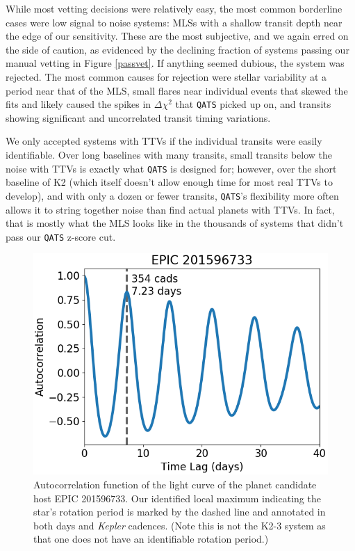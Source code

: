 \documentclass[twocolumn]{aastex62}
\newcommand{\project}[1]{\textsl{#1}}
\newcommand{\pipeline}[1]{\texttt{#1}}
\begin{document}
While most vetting decisions were relatively easy, the most common
borderline cases were low signal to noise systems: MLSs with a shallow
transit depth near the edge of our sensitivity.  These are the most
subjective, and we again erred on the side of caution, as evidenced by
the declining fraction of systems passing our manual vetting in Figure
\ref{passvet}. If anything seemed dubious, the system was rejected.
The most common causes for rejection were stellar variability at a
period near that of the MLS, small flares near individual events that
skewed the fits and likely caused the spikes in $\Delta\chi^2$ that
\pipeline{QATS} picked up on, and transits showing significant and
uncorrelated transit timing variations.

We only accepted systems with TTVs if the individual transits were
easily identifiable. Over long baselines with many transits, small
transits below the noise with TTVs is exactly what \pipeline{QATS} is
designed for; however, over the short baseline of K2 (which itself
doesn't allow enough time for most real TTVs to develop), and with
only a dozen or fewer transits, \pipeline{QATS}'s flexibility more
often allows it to string together noise than find actual planets with
TTVs. In fact, that is mostly what the MLS looks like in the thousands
of systems that didn't pass our \pipeline{QATS} z-score cut.

\begin{figure}[tbp]
\includegraphics[width=\columnwidth]{autocorrelation.png}
\caption{Autocorrelation function of the light curve of the planet
  candidate host EPIC 201596733. Our identified local maximum
  indicating the star's rotation period is marked by the dashed line
  and annotated in both days and \project{Kepler} cadences. (Note this
  is not the K2-3 system as that one does not have an identifiable
  rotation period.) \label{autocorrelation}}
\end{figure}
\end{document}
